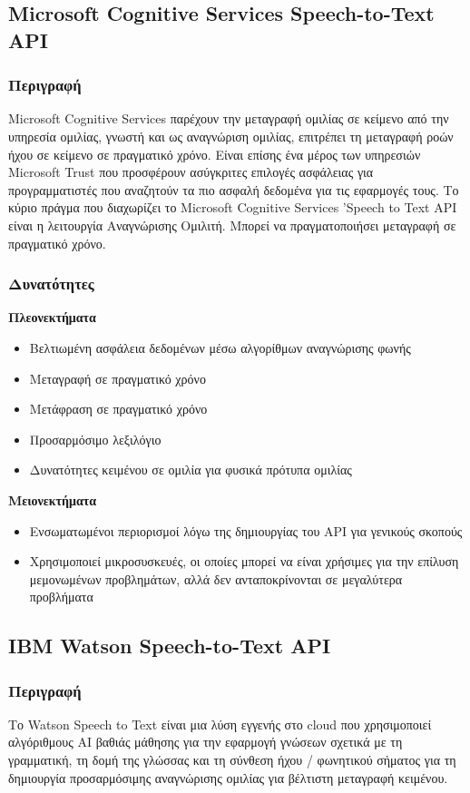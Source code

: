 \documentclass[oneside, 12pt]{book}
\begin{document}
\subsection{Microsoft Cognitive Services Speech-to-Text API}
\label{subsec:microsoft-cognitive-services-speech-to-text-api}
\subsubsection{Περιγραφή}
Microsoft Cognitive Services παρέχουν την μεταγραφή ομιλίας σε κείμενο από την υπηρεσία ομιλίας,
γνωστή και ως αναγνώριση ομιλίας, επιτρέπει τη μεταγραφή ροών ήχου σε κείμενο σε πραγματικό χρόνο.
Είναι επίσης ένα μέρος των υπηρεσιών Microsoft Trust που προσφέρουν ασύγκριτες επιλογές ασφάλειας
για προγραμματιστές που αναζητούν τα πιο ασφαλή δεδομένα για τις εφαρμογές τους.
Το κύριο πράγμα που διαχωρίζει το Microsoft Cognitive Services ’Speech to Text API είναι η
λειτουργία Αναγνώρισης Ομιλιτή.
Μπορεί να πραγματοποιήσει μεταγραφή σε πραγματικό χρόνο.
\subsubsection{Δυνατότητες}
\noindent
\textbf{Πλεονεκτήματα}
\begin{itemize}
  \item Βελτιωμένη ασφάλεια δεδομένων μέσω αλγορίθμων αναγνώρισης φωνής
  \item Μεταγραφή σε πραγματικό χρόνο
  \item Μετάφραση σε πραγματικό χρόνο
  \item Προσαρμόσιμο λεξιλόγιο
  \item Δυνατότητες κειμένου σε ομιλία για φυσικά πρότυπα ομιλίας
\end{itemize}
\textbf{Μειονεκτήματα}
\begin{itemize}
  \item Ενσωματωμένοι περιορισμοί λόγω της δημιουργίας του API για γενικούς σκοπούς
  \item Χρησιμοποιεί μικροσυσκευές, οι οποίες μπορεί να είναι χρήσιμες για την επίλυση μεμονωμένων προβλημάτων, αλλά δεν ανταποκρίνονται σε μεγαλύτερα προβλήματα
\end{itemize}
\subsection{IBM Watson Speech-to-Text API}
\subsubsection{Περιγραφή}
Το Watson Speech to Text είναι μια λύση εγγενής στο cloud που χρησιμοποιεί αλγόριθμους AI βαθιάς μάθησης για την εφαρμογή γνώσεων σχετικά με τη γραμματική, τη δομή της γλώσσας και τη σύνθεση ήχου / φωνητικού σήματος για τη δημιουργία προσαρμόσιμης αναγνώρισης ομιλίας για βέλτιστη μεταγραφή κειμένου.
\end{document}

